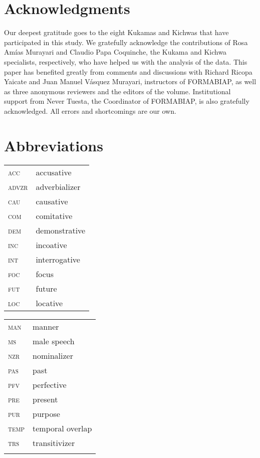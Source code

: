 \documentclass[output=paper]{langscibook}
\begin{document}
\section*{Acknowledgments}
Our deepest gratitude goes to the eight Kukamas and Kichwas that have participated in this study. We gratefully acknowledge the contributions of Rosa Amías Murayari and Claudio Papa Coquinche, the Kukama and Kichwa specialists, respectively, who have helped us with the analysis of the data. This paper has benefited greatly from comments and discussions with Richard Ricopa Yaicate and Juan Manuel Vásquez Murayari, instructors of FORMABIAP, as well as three anonymous reviewers and the editors of the volume. Institutional support from Never Tuesta, the Coordinator of FORMABIAP, is also gratefully acknowledged. All errors and shortcomings are our own.


\section*{Abbreviations}

\begin{tabularx}{.5\textwidth}{@{}lQ}
\textsc{acc}& accusative\\
\textsc{advzr}& adverbializer\\
\textsc{cau}& causative\\
\textsc{com}& comitative\\
\textsc{dem}& demonstrative\\
\textsc{inc}& incoative\\
\textsc{int}& interrogative\\
\textsc{foc}& focus\\
\textsc{fut}& future\\
\textsc{loc}& locative\\
\end{tabularx}\begin{tabularx}{.5\textwidth}{lQ@{}}
\textsc{man}& manner\\
\textsc{ms}& male speech\\
\textsc{nzr}& nominalizer\\
\textsc{pas}& past\\
\textsc{pfv}& perfective\\
\textsc{pre}& present\\
\textsc{pur}& purpose\\
\textsc{temp}& temporal overlap\\
\textsc{trs}& transitivizer\\
 \\
\end{tabularx}

\sloppy
\printbibliography[heading=subbibliography,notkeyword=this]
\end{document}

